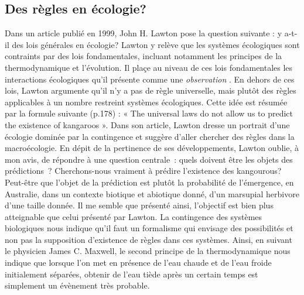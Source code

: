 \subsection*{Des règles en
écologie?}\label{des-ruxe8gles-en-uxe9cologie}

Dans un article publié en 1999, John H. Lawton pose la question suivante
: y a-t-il des lois générales en écologie? Lawton y relève que les
systèmes écologiques sont contraints par des lois fondamentales,
incluant notamment les principes de la thermodynamique et l'évolution.
Il plaçe au niveau de ces lois fondamentales les interactions
écologiques qu'il présente comme une \emph{observation} \citep[selon ces
mots,][]{Lawton1999}. En dehors de ces lois, Lawton argumente qu'il n'y
a pas de règle universelle, mais plutôt des règles applicables à un
nombre restreint systèmes écologiques. Cette idée est résumée par la
formule suivante (p.178) : « The universal laws do not allow us to
predict the existence of kangaroos ». Dans son article, Lawton dresse un
portrait d'une écologie dominée par la contingence et suggère d'aller
chercher des règles dans la macroécologie. En dépit de la pertinence de
ses développements, Lawton oublie, à mon avis, de répondre à une
question centrale~: quels doivent être les objets des prédictions~?
Cherchons-nous vraiment à prédire l'existence des kangourous? Peut-être
que l'objet de la prédiction est plutôt la probabilité de l'émergence,
en Australie, dans un contexte biotique et abiotique donné, d'un
marsupial herbivore d'une taille donnée. Il me semble que présenté
ainsi, l'objectif est bien plus atteignable que celui présenté par
Lawton. La contingence des systèmes biologiques nous indique qu'il faut
un formalisme qui envisage des possibilités et non pas la supposition
d'existence de règles dans ces systèmes. Ainsi, en suivant le physicien
James C. Maxwell, le second principe de la thermodynamique nous indique
que lorsque l'on met en présence de l'eau chaude et de l'eau froide
initialement séparées, obtenir de l'eau tiède après un certain temps est
simplement un évènement très probable.

